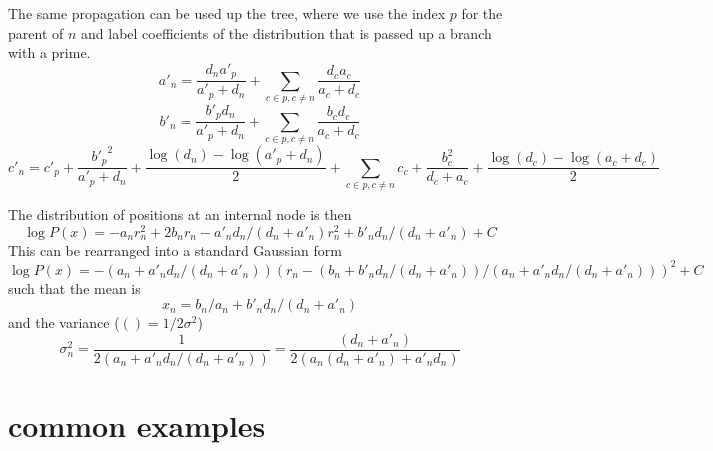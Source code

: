 \documentclass[aps,rmp, onecolumn]{revtex4}
\begin{document}
The same propagation can be used up the tree, where we use the index $p$ for the parent of $n$ and label coefficients of the distribution that is passed up a branch with a prime.
\begin{equation}
    a'_n  =  \frac{d_n a'_p}{a'_p + d_n} + \sum_{c\in p, c\neq n} \frac{d_c a_c}{a_c+d_c}
\end{equation}
\begin{equation}
    b'_n = \frac{b'_p d_n}{a'_p + d_n} + \sum_{c\in p, c\neq n}\frac{b_c d_c}{a_c + d_c}
\end{equation}
\begin{equation}
    c'_n = c'_p + \frac{{b'_p}^2}{a'_p + d_n} + \frac{\log(d_n) - \log(a'_p+d_n)}{2} +  \sum_{c\in p, c\neq n} c_c  + \frac{b_c^2}{d_c + a_c} + \frac{\log(d_c) - \log(a_c+d_c)}{2}
\end{equation}

The distribution of positions at an internal node is then
\begin{equation}
    \log P(x) = -a_n r_n^2 + 2 b_n r_n - a'_n d_n/(d_n + a'_n) r_n^2 + b'_n d_n/(d_n + a'_n) + C
\end{equation}
This can be rearranged into a standard Gaussian form
\begin{equation}
    \log P(x) = -(a_n + a'_n d_n/(d_n + a'_n)) (r_n - (b_n + b'_n d_n/(d_n + a'_n))/(a_n + a'_n d_n/(d_n + a'_n)))^2 + C
\end{equation}
such that the mean is
\begin{equation}
    x_n = b_n/a_n + b'_n d_n/(d_n + a'_n)
\end{equation}
and the variance ($() = 1/2\sigma^2$)
\begin{equation}
    \sigma^2_n = \frac{1}{2(a_n + a'_n d_n/(d_n + a'_n))} = \frac{(d_n + a'_n)}{2(a_n(d_n + a'_n) + a'_n d_n)}
\end{equation}

\section{common examples}
\end{document}
